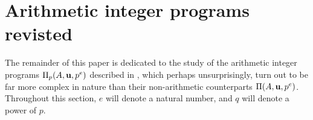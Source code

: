 \documentclass[11pt]{amsart}
\begin{document}
%


\newpage
\section{Arithmetic integer programs revisted}


The remainder of this paper is dedicated to the study of the arithmetic integer programs $\Pi_p(A, \mathbf{u}, p^e)$ described in , which perhaps unsurprisingly, turn out to be far more complex in nature than their non-arithmetic counterparts $\Pi(A, \mathbf{u}, p^e)$.    Throughout this section, $e$ will denote a natural number, and $q$ will denote a power of $p$.  
\end{document}

